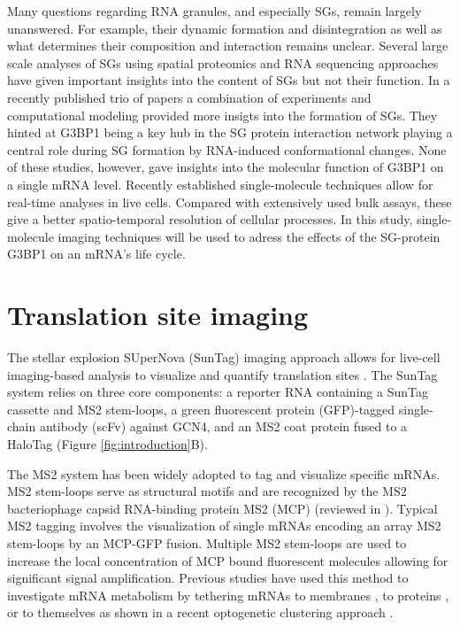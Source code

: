 Many questions regarding RNA granules, and especially SGs, remain largely unanswered.
For example, their dynamic formation and disintegration as well as what determines their composition and interaction remains unclear.
Several large scale analyses of SGs using spatial proteomics \cite{markmiller_context-dependent_2018, jain_atpase-modulated_2016, youn_high-density_2018} and RNA sequencing \cite{khong_isolation_2018} approaches have given important insights into the content of SGs but not their function.
In a recently published trio of papers \cite{guillen-boixet_rna-induced_2020, sanders_competing_2020, yang_g3bp1_2020} a combination of experiments and computational modeling provided more insigts into the formation of SGs.
They hinted at G3BP1 being a key hub in the SG protein interaction network playing a central role during SG formation by RNA-induced conformational changes.
None of these studies, however, gave insights into the molecular function of G3BP1 on a single mRNA level.
Recently established single-molecule techniques allow for real-time analyses in live cells.
Compared with extensively used bulk assays, these give a better spatio-temporal resolution of cellular processes.
In this study, single-molecule imaging techniques will be used to adress the effects of the SG-protein G3BP1 on an mRNA's life cycle.

    
\section{Translation site imaging} \label{translation_site_imaging}

The stellar explosion SUperNova (SunTag) imaging approach allows for live-cell imaging-based analysis to visualize and quantify translation sites \cite{tanenbaum_protein-tagging_2014}.
The SunTag system relies on three core components: a reporter RNA containing a SunTag cassette and MS2 stem-loops, a green fluorescent protein (GFP)-tagged single-chain antibody (scFv) against GCN4, and an MS2 coat protein fused to a HaloTag (Figure \ref{fig:introduction}B).

The MS2 system has been widely adopted to tag and visualize specific mRNAs.
MS2 stem-loops serve as structural motifs and are recognized by the MS2 bacteriophage capsid RNA-binding protein MS2 (MCP) (reviewed in \cite{george_intracellular_2018}).
Typical MS2 tagging involves the visualization of single mRNAs encoding an array MS2 stem-loops by an MCP-GFP fusion.
Multiple MS2 stem-loops are used to increase the local concentration of MCP bound fluorescent molecules allowing for significant signal amplification.
Previous studies have used this method to investigate mRNA metabolism by tethering mRNAs to membranes \cite{genz_association_2013}, to proteins \cite{bos_tethered_2016}, or to themselves as shown in a recent optogenetic clustering approach \cite{kim_optogenetic_2020}.

